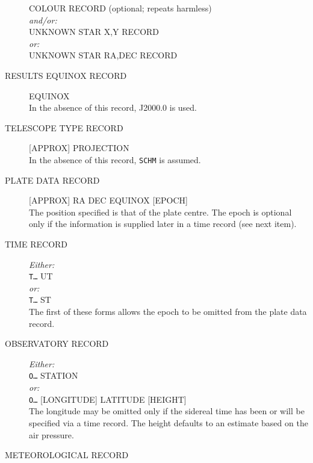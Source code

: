\documentclass[twoside,11pt]{article}
\newcommand{\xlabel}[1]{}
\renewcommand{\_}{\texttt{\symbol{95}}}
\begin{document}
\begin{description}
 COLOUR RECORD (optional; repeats harmless) \\
 \textit{and/or:} \\
 UNKNOWN STAR X,Y RECORD \\
 \textit{or:} \\
 UNKNOWN STAR RA,DEC RECORD

\goodbreak
\item[\xlabel{RESULTS_EQUINOX_RECORD}RESULTS EQUINOX RECORD]\mbox{}

 EQUINOX \\
 In the absence of this record, J2000.0 is used.

\goodbreak
\item[\xlabel{TELESCOPE_TYPE_RECORD}TELESCOPE TYPE RECORD]\mbox{}

 [APPROX] PROJECTION \\
 In the absence of this record, \texttt{SCHM} is assumed.

\goodbreak
\item[\xlabel{PLATE_DATA_RECORD}PLATE DATA RECORD]\mbox{}

 [APPROX] RA DEC EQUINOX [EPOCH] \\
 The position specified is that of the plate centre.
 The epoch is optional only if the information is supplied
 later in a time record (see next item).

\goodbreak
\item[\xlabel{TIME_RECORD}TIME RECORD]\mbox{}

 \textit{Either:} \\
 \texttt{T\ldots} UT \\
 \textit{or:} \\
 \texttt{T\ldots} ST \\
 The first of these forms allows the epoch to be omitted from
 the plate data record.

\goodbreak
\item[\xlabel{OBSERVATORY_RECORD}OBSERVATORY RECORD]\mbox{}

 \textit{Either:} \\
 \texttt{O\ldots} STATION \\
 \textit{or:} \\
 \texttt{O\ldots} [LONGITUDE] LATITUDE [HEIGHT] \\
 The longitude may be omitted only if the sidereal
 time has been or will be specified via a time record.
 The height defaults to an estimate based on the air pressure.

\goodbreak
\item[\xlabel{METEOROLOGICAL_RECORD}METEOROLOGICAL RECORD]\mbox{}


\end{description}
\end{document}
